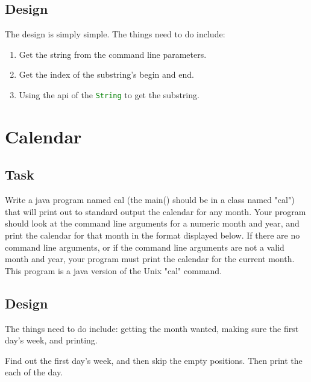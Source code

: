 \documentclass{article}
\begin{document}
\subsection{Design}
\label{sec:sub:design}

The design is simply simple. The things need to do include:

\begin{enumerate}
    \item Get the string from the command line parameters.
    \item Get the index of the substring's begin and end.
    \item Using the api of the \lstinline[language=Java]|String|
        to get the substring.
   \end{enumerate} 


\section{Calendar}
\label{sec:cal}

\subsection{Task}
\label{sec:cal:task}

Write a java program named cal (the main() should be in a class named "cal") that will print out to standard output the calendar for any month.
Your program should look at the command line arguments for a numeric month and year,
and print the calendar for that month in the format displayed below. If there are no command line arguments,
or if the command line arguments are not a valid month and year, your program must print the calendar for the current month.
This program is a java version of the Unix "cal" command.

\subsection{Design}

The things need to do include: getting the month wanted, making sure the first day's week, and printing.

Find out the first day's week, and then skip the empty positions. Then print the each of the day.
\end{document}
